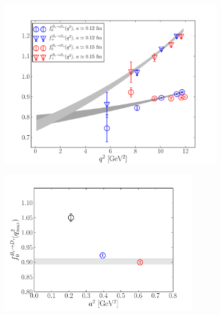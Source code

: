 \begin{figure}
  \vspace{-20pt}
  \begin{center}
    \includegraphics[width=0.85\textwidth]{images/NRQCD/new/BsDs_formfactors.pdf}
  \end{center}
  \caption{}
  \vspace{-20pt}
\end{figure}

\begin{figure}
  \vspace{-20pt}
  \begin{center}
    \includegraphics[width=0.75\textwidth]{images/NRQCD/new/BsDs_f0q2max.pdf}
  \end{center}
  \caption{}
  \vspace{-20pt}
\end{figure}


